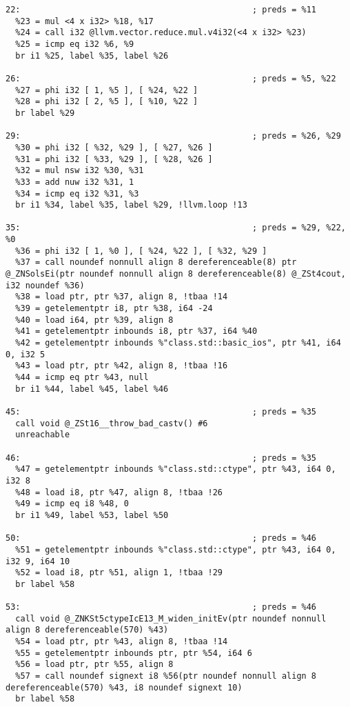 \documentclass[UTF8,a4paper,10pt]{ctexart}
\begin{document}
\begin{lstlisting}[title=O2优化,frame=trbl]
22:                                               ; preds = %11
  %23 = mul <4 x i32> %18, %17
  %24 = call i32 @llvm.vector.reduce.mul.v4i32(<4 x i32> %23)
  %25 = icmp eq i32 %6, %9
  br i1 %25, label %35, label %26

26:                                               ; preds = %5, %22
  %27 = phi i32 [ 1, %5 ], [ %24, %22 ]
  %28 = phi i32 [ 2, %5 ], [ %10, %22 ]
  br label %29

29:                                               ; preds = %26, %29
  %30 = phi i32 [ %32, %29 ], [ %27, %26 ]
  %31 = phi i32 [ %33, %29 ], [ %28, %26 ]
  %32 = mul nsw i32 %30, %31
  %33 = add nuw i32 %31, 1
  %34 = icmp eq i32 %31, %3
  br i1 %34, label %35, label %29, !llvm.loop !13

35:                                               ; preds = %29, %22, %0
  %36 = phi i32 [ 1, %0 ], [ %24, %22 ], [ %32, %29 ]
  %37 = call noundef nonnull align 8 dereferenceable(8) ptr @_ZNSolsEi(ptr noundef nonnull align 8 dereferenceable(8) @_ZSt4cout, i32 noundef %36)
  %38 = load ptr, ptr %37, align 8, !tbaa !14
  %39 = getelementptr i8, ptr %38, i64 -24
  %40 = load i64, ptr %39, align 8
  %41 = getelementptr inbounds i8, ptr %37, i64 %40
  %42 = getelementptr inbounds %"class.std::basic_ios", ptr %41, i64 0, i32 5
  %43 = load ptr, ptr %42, align 8, !tbaa !16
  %44 = icmp eq ptr %43, null
  br i1 %44, label %45, label %46

45:                                               ; preds = %35
  call void @_ZSt16__throw_bad_castv() #6
  unreachable

46:                                               ; preds = %35
  %47 = getelementptr inbounds %"class.std::ctype", ptr %43, i64 0, i32 8
  %48 = load i8, ptr %47, align 8, !tbaa !26
  %49 = icmp eq i8 %48, 0
  br i1 %49, label %53, label %50

50:                                               ; preds = %46
  %51 = getelementptr inbounds %"class.std::ctype", ptr %43, i64 0, i32 9, i64 10
  %52 = load i8, ptr %51, align 1, !tbaa !29
  br label %58

53:                                               ; preds = %46
  call void @_ZNKSt5ctypeIcE13_M_widen_initEv(ptr noundef nonnull align 8 dereferenceable(570) %43)
  %54 = load ptr, ptr %43, align 8, !tbaa !14
  %55 = getelementptr inbounds ptr, ptr %54, i64 6
  %56 = load ptr, ptr %55, align 8
  %57 = call noundef signext i8 %56(ptr noundef nonnull align 8 dereferenceable(570) %43, i8 noundef signext 10)
  br label %58


\end{lstlisting}
\end{document}
